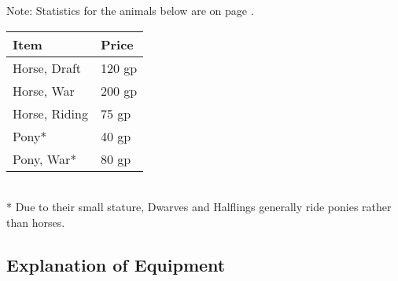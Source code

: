 \documentclass[a4paper,twoside,openany,10pt]{book}
\begin{document}
\begin{multicols}{2}
Note: Statistics for the animals below are on page
\hyperlink{beasts-of-burden-1}{\pageref{beasts-of-burden-1}}.

\medskip

\begin{tabular*}{0.93\linewidth}{@{\extracolsep{\fill}}ll}
\textbf{Item} & \textbf{Price} \\\toprule
Horse, Draft & 120 gp \\\hline
Horse, War & 200 gp \\\hline
Horse, Riding & 75 gp \\\hline
Pony* & 40 gp \\\hline
Pony, War* & 80 gp \\\bottomrule
\end{tabular*}\\

* Due to their small stature, Dwarves and Halflings generally ride ponies rather than horses.

\end{multicols}

\pagebreak

\subsection{Explanation of Equipment}\label{explanation-of-equipment}
\end{document}
